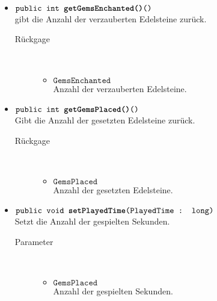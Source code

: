 \begin{description}
\begin{itemize}
					\item $\texttt{public  int \textbf{getGemsEnchanted()}()}$ \\ gibt die Anzahl der verzauberten Edelsteine zurück.
				\begin{description}
				\item[Rückgage] \hfill \\
					\vspace{-.8cm}
					\begin{itemize}
						\item $\texttt{GemsEnchanted }$ \\ Anzahl der verzauberten Edelsteine.
					\end{itemize}	
					\end{description}
					\item $\texttt{public  int \textbf{getGemsPlaced()}()}$ \\ Gibt die Anzahl der gesetzten Edelsteine zurück.
				\begin{description}
				\item[Rückgage] \hfill \\
					\vspace{-.8cm}
					\begin{itemize}
						\item $\texttt{GemsPlaced }$ \\ Anzahl der gesetzten Edelsteine.
					\end{itemize}	
					\end{description}
					\item $\texttt{public  void \textbf{setPlayedTime}(PlayedTime : long)}$ \\ Setzt die Anzahl der gespielten Sekunden.
				\begin{description}
				\item[Parameter] \hfill \\
					\vspace{-.8cm}
					\begin{itemize}
						\item $\texttt{GemsPlaced }$ \\ Anzahl der gespielten Sekunden.
					\end{itemize}	
					\end{description}			
					

\end{itemize}
\end{description}

